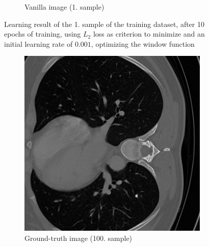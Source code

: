 \documentclass[12pt,a4paper]{article}
\begin{document}
\begin{figure}[h!]
\begin{subfigure}[t]{\size\textwidth}
        \caption{Vanilla image (1. sample)}
        \label{fig:windowII+l2+slow+subset_vanilla0}
    \end{subfigure}
    \caption{Learning result of the 1. sample of the training dataset, after 10 epochs of training, using $L_2$ loss as criterion to minimize and an initial learning rate of $0.001$, optimizing the window function}
    \label{fig:windowII+l2+1000_image1} %
\end{figure}

\begin{figure}[h!]
    \centering %
        \newcommand\size{0.49}
    \begin{subfigure}[t]{\size\textwidth}
        \centering
        \includegraphics[width=\textwidth]{Bachelorthesis/UsedImages/Train1000_L2_100epochs/Training_L2_1000_100epochs_after10/gt_100_train1000l2100.png}
        \caption{Ground-truth image (100. sample)} %
        \label{fig:windowII+l2+slow+subset_gt100}
    \end{subfigure}
    \hfill %
    \begin{subfigure}[t]{\size\textwidth}

\end{subfigure}
\end{figure}
\end{document}
